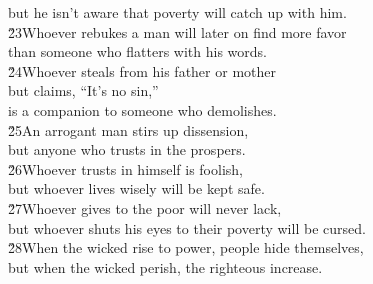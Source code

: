 \begin{poetry}
\poemll    but he isn't aware that poverty will catch up with him. \\
\poeml \v{23}Whoever rebukes a man will later on find more favor \\
\poemll    than someone who flatters with his words. \\
\poeml \v{24}Whoever steals from his father or mother \\
\poemll    but claims, ``It's no sin,'' \\
\poemlll       is a companion to someone who demolishes. \\
\poeml \v{25}An arrogant man stirs up dissension, \\
\poemll    but anyone who trusts in the  prospers. \\
\poeml \v{26}Whoever trusts in himself is foolish, \\
\poemll    but whoever lives wisely will be kept safe. \\
\poeml \v{27}Whoever gives to the poor will never lack, \\
\poemll    but whoever shuts his eyes to their poverty will be cursed. \\
\poeml \v{28}When the wicked rise to power, people hide themselves, \\
\poemll    but when the wicked perish, the righteous increase.
\end{poetry}

